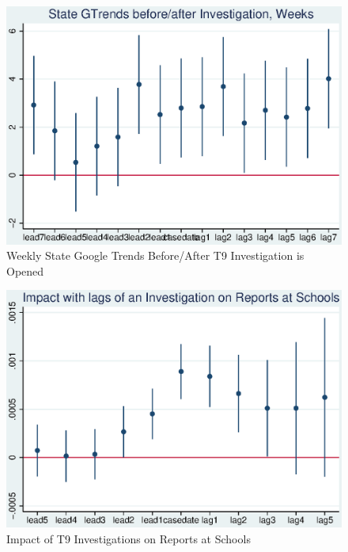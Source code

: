 \documentclass[AER]{AEA}
\begin{document}
\begin{figure}
\includegraphics[]{figures/state_trend_cases.eps}

\caption{Weekly State Google Trends Before/After T9 Investigation is Opened}

\end{figure}

\begin{figure}
\includegraphics[width=4.9in]{figures/cases_schools_reports_lags.eps}

\caption{Impact of T9 Investigations on Reports at Schools}
\end{figure}
\end{document}
